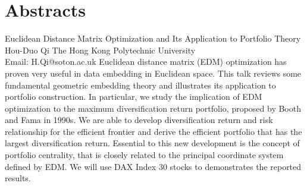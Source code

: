 \documentclass[
	openany, %
	parskip=full, %
	12pt, %
	a4paper, %
]{conferencebooklet} %
\begin{document}
\chapter*{Abstracts}
\abstract
    {Euclidean Distance Matrix Optimization and Its Application to Portfolio Theory}
    {Hou-Duo Qi}
    {}
    {The Hong Kong Polytechnic University\\
    Email: H.Qi@soton.ac.uk}
    {Euclidean distance matrix (EDM) optimization has proven very useful in data embedding in Euclidean space. This talk reviews some fundamental geometric embedding theory and illustrates its application to portfolio construction. In particular, we study the implication of EDM optimization to the maximum diversification return portfolio, proposed by Booth and Fama in 1990s. We are able to develop diversification return and risk relationship for the efficient frontier and derive the efficient portfolio that has the largest diversification return. Essential to this new development is the concept of portfolio centrality, that is closely related to the principal coordinate system defined by EDM. We will use DAX Index 30 stocks to demonstrates the reported results.}
\end{document}

